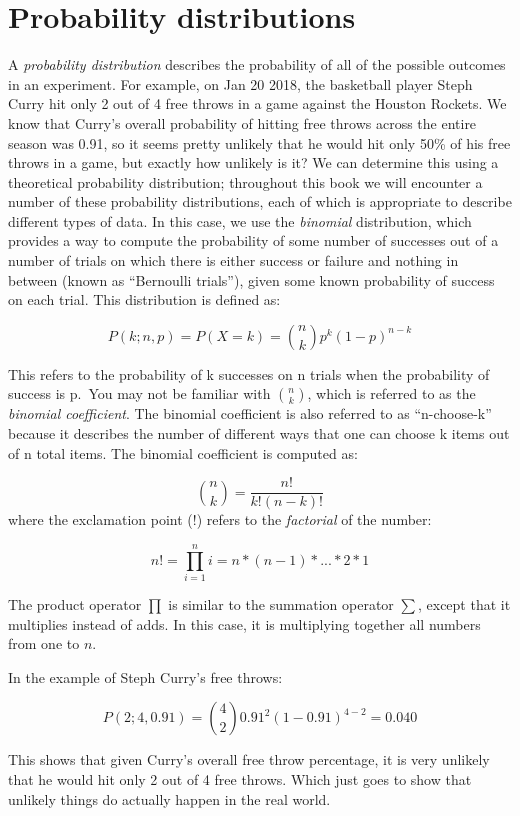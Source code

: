 \documentclass[
  12pt,
]{book}
\begin{document}
\hypertarget{probability-distributions}{%
\section{Probability distributions}\label{probability-distributions}}

A \emph{probability distribution} describes the probability of all of the possible outcomes in an experiment. For example, on Jan 20 2018, the basketball player Steph Curry hit only 2 out of 4 free throws in a game against the Houston Rockets. We know that Curry's overall probability of hitting free throws across the entire season was 0.91, so it seems pretty unlikely that he would hit only 50\% of his free throws in a game, but exactly how unlikely is it? We can determine this using a theoretical probability distribution; throughout this book we will encounter a number of these probability distributions, each of which is appropriate to describe different types of data. In this case, we use the \emph{binomial} distribution, which provides a way to compute the probability of some number of successes out of a number of trials on which there is either success or failure and nothing in between (known as ``Bernoulli trials''), given some known probability of success on each trial. This distribution is defined as:

\[
P(k; n,p) = P(X=k) = \binom{n}{k} p^k(1-p)^{n-k}
\]

This refers to the probability of k successes on n trials when the probability of success is p.~You may not be familiar with \(\binom{n}{k}\), which is referred to as the \emph{binomial coefficient}. The binomial coefficient is also referred to as ``n-choose-k'' because it describes the number of different ways that one can choose k items out of n total items. The binomial coefficient is computed as:

\[
\binom{n}{k} = \frac{n!}{k!(n-k)!}
\]
where the exclamation point (!) refers to the \emph{factorial} of the number:

\[
n! = \prod_{i=1}^n i = n*(n-1)*...*2*1 
\]

The product operator \(\prod\) is similar to the summation operator \(\sum\), except that it multiplies instead of adds. In this case, it is multiplying together all numbers from one to \(n\).

In the example of Steph Curry's free throws:

\[
P(2;4,0.91) = \binom{4}{2} 0.91^2(1-0.91)^{4-2} = 0.040
\]

This shows that given Curry's overall free throw percentage, it is very unlikely that he would hit only 2 out of 4 free throws. Which just goes to show that unlikely things do actually happen in the real world.
\end{document}
